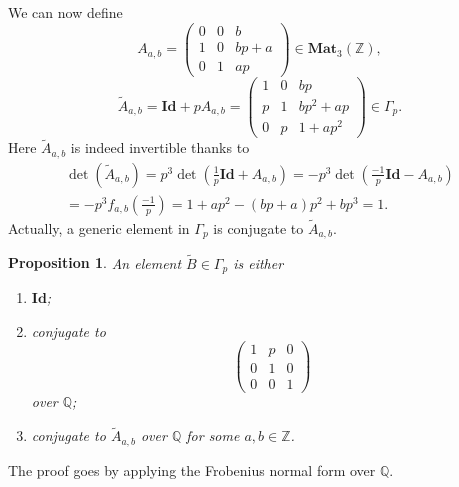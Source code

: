 \documentclass[a4paper]{article}
\newtheorem{Prop}[Thm]{Proposition}
\newcommand{\Id}{\mathbf{Id}}        %
\newcommand{\GL}{\mathbf{GL}_3} %
\newcommand{\PGL}{\mathbf{GL}_3} %
\newcommand{\MatZ}{\mathbf{Mat}_3(\mathbb{Z})}        %
\newcommand{\SLp}{\Gamma_p}        %
\begin{document}
We can now define
\begin{equation}
\label{matrix_small_family}
A_{a, b} = 
\begin{pmatrix}
0 & 0 & b \\
1 & 0 & bp+a \\
0 & 1 & ap
\end{pmatrix}
\in \MatZ,
\end{equation}
\begin{equation}
\label{matrix_big_family}
\tilde A_{a, b} = \Id + p A_{a, b} =
\begin{pmatrix}
1 & 0 & b p \\
p & 1 & b p^2 + a p \\
0 & p & 1 + a p^2
\end{pmatrix}
\in \SLp.
\end{equation}
Here $\tilde A_{a, b}$ is indeed invertible thanks to 
\begin{multline}
	\label{computation_char_poly_of_a_tilde_family}
	\det({{\tilde{A}}_{a,b}})
= p^3 \det \left(\frac{1}p \Id + A_{a,b}\right) 
= - p^3 \det \left(\frac{-1}p \Id - A_{a,b}\right) \\
= - p^3 f_{a,b}\left(\frac{-1}p\right)
= 1 + a p^2 - (b p + a) p^2 + b p^3
= 1
.\end{multline}
Actually, a generic element in $\SLp$ is conjugate to $\tilde A_{a, b}$.
\begin{Prop}
An element $\tilde B \in \SLp$ is either
\begin{enumerate}
	\item $\Id$;
	\item conjugate to 
		\[
		\begin{pmatrix}
		1 & p & 0 \\
		0 & 1 & 0 \\
		0 & 0 & 1
		\end{pmatrix}
		\] 
		over $\mathbb{Q}$;
	\item conjugate to $\tilde A_{a, b}$ over $\mathbb{Q}$ for some $a, b \in \mathbb{Z}$.
\end{enumerate}
\end{Prop}
The proof goes by applying the Frobenius normal form over $ \mathbb{Q}$.
\end{document}

